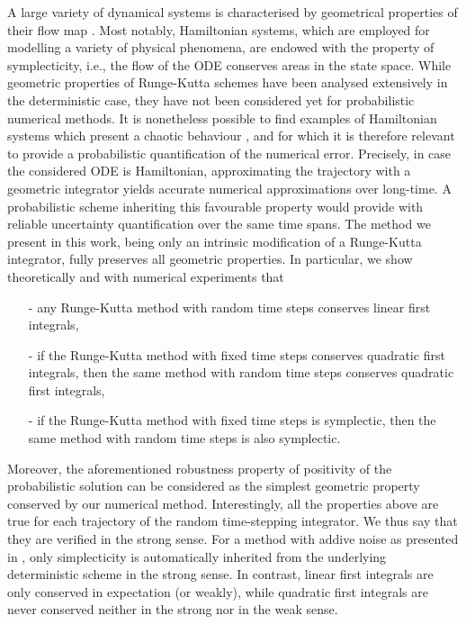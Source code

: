 \documentclass{siamart1116}
\numberwithin{theorem}{section}
\begin{document}
A large variety of dynamical systems is characterised by geometrical properties of their flow map \cite{HLW06}. Most notably, Hamiltonian systems, which are employed for modelling a variety of physical phenomena, are endowed with the property of symplecticity, i.e., the flow of the ODE conserves areas in the state space. While geometric properties of Runge-Kutta schemes have been analysed extensively in the deterministic case, they have not been considered yet for probabilistic numerical methods. It is nonetheless possible to find examples of Hamiltonian systems which present a chaotic behaviour \cite{HeH64}, and for which it is therefore relevant to provide a probabilistic quantification of the numerical error. Precisely, in case the considered ODE is Hamiltonian, approximating the trajectory with a geometric integrator yields accurate numerical approximations over long-time. A probabilistic scheme inheriting this favourable property would provide with reliable uncertainty quantification over the same time spans. The method we present in this work, being only an intrinsic modification of a Runge-Kutta integrator, fully preserves all geometric properties. In particular, we show theoretically and with numerical experiments that
\begin{itemize}
	\item[-] any Runge-Kutta method with random time steps conserves linear first integrals,
	\item[-] if the Runge-Kutta method with fixed time steps conserves quadratic first integrals, then the same method with random time steps conserves quadratic first integrals,
	\item[-] if the Runge-Kutta method with fixed time steps is symplectic, then the same method with random time steps is also symplectic.
\end{itemize}
Moreover, the aforementioned robustness property of positivity of the probabilistic solution can be considered as the simplest geometric property conserved by our numerical method. Interestingly, all the properties above are true for each trajectory of the random time-stepping integrator. We thus say that they are verified in the strong sense. For a method with addive noise as presented in \cite{CGS16}, only simplecticity is automatically inherited from the underlying deterministic scheme in the strong sense. In contrast, linear first integrals are only conserved in expectation (or weakly), while quadratic first integrals are never conserved neither in the strong nor in the weak sense. 
\end{document}

